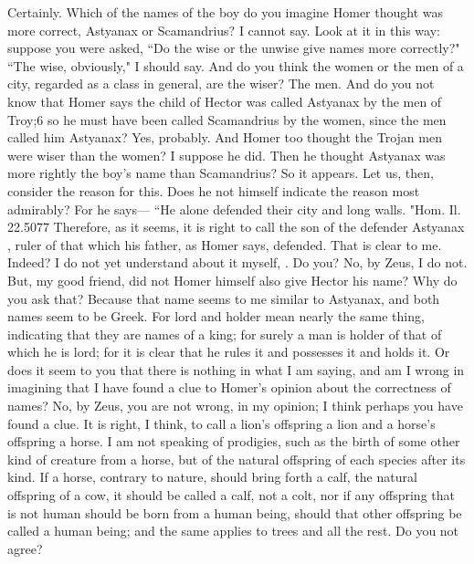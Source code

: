 \hermogenesspeaks
Certainly.
\socratesspeaks
Which of the names of the boy do you imagine Homer thought was more correct, Astyanax or Scamandrius? 
\hermogenesspeaks
I cannot say.
\socratesspeaks
Look at it in this way: suppose you were asked, ``Do the wise or the unwise give names more correctly?"
\hermogenesspeaks
``The wise, obviously," I should say.
\socratesspeaks
And do you think the women or the men of a city, regarded as a class in general, are the wiser?
\hermogenesspeaks
The men.
\socratesspeaks
And do you not know that Homer says the child of Hector was called Astyanax by the men of Troy;6  so he must have been called Scamandrius by the women, since the men called him Astyanax?
\hermogenesspeaks
Yes, probably.
\socratesspeaks
And Homer too thought the Trojan men were wiser than the women?
\hermogenesspeaks
I suppose he did.
\socratesspeaks
Then he thought Astyanax was more rightly the boy's name than Scamandrius?
\hermogenesspeaks
So it appears.
\socratesspeaks
Let us, then, consider the reason for this. Does he not himself indicate the reason most admirably? For he says—  ``He alone defended their city and long walls.
"Hom. Il. 22.5077 Therefore, as it seems, it is right to call the son of the defender Astyanax , ruler of that which his father, as Homer says, defended.
\hermogenesspeaks
That is clear to me.
\socratesspeaks
Indeed? I do not yet understand about it myself, \hermogenesspeaks. Do you?
\hermogenesspeaks
No, by Zeus, I do not. 
\socratesspeaks
But, my good friend, did not Homer himself also give Hector his name?
\hermogenesspeaks
Why do you ask that?
\socratesspeaks
Because that name seems to me similar to Astyanax, and both names seem to be Greek. For lord  and holder  mean nearly the same thing, indicating that they are names of a king; for surely a man is holder of that of which he is lord; for it is clear that he rules it and possesses it and holds it.  Or does it seem to you that there is nothing in what I am saying, and am I wrong in imagining that I have found a clue to Homer's opinion about the correctness of names?
\hermogenesspeaks
No, by Zeus, you are not wrong, in my opinion; I think perhaps you have found a clue.
\socratesspeaks
It is right, I think, to call a lion's offspring a lion and a horse's offspring a horse. I am not speaking of prodigies, such as the birth of some other kind of creature from a horse,  but of the natural offspring of each species after its kind. If a horse, contrary to nature, should bring forth a calf, the natural offspring of a cow, it should be called a calf, not a colt, nor if any offspring that is not human should be born from a human being, should that other offspring be called a human being; and the same applies to trees and all the rest. Do you not agree?
